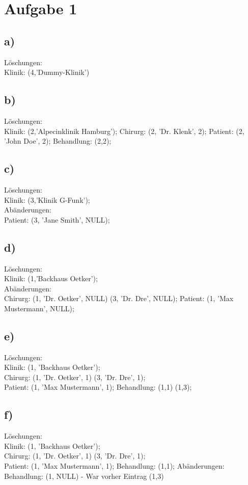 \section*{Aufgabe 1}
\subsection*{a)}
Löschungen:\\
Klinik: (4,'Dummy-Klinik')
\subsection*{b)}
Löschungen:\\
Klinik: (2,'Alpecinklinik Hamburg');
Chirurg: (2, 'Dr. Klenk', 2);
Patient: (2, 'John Doe', 2);
Behandlung: (2,2);
\subsection*{c)}
Löschungen:\\
Klinik: (3,'Klinik G-Funk');\\
Abänderungen:\\
Patient: (3, 'Jane Smith', NULL);
\subsection*{d)}
Löschungen:\\
Klinik: (1,'Backhaus Oetker');\\
Abänderungen:\\
Chirurg: (1, 'Dr. Oetker', NULL) (3, 'Dr. Dre', NULL);
Patient: (1, 'Max Mustermann', NULL);
\subsection*{e)}
Löschungen:\\
Klinik: (1, 'Backhaus Oetker');\\
Chirurg: (1, 'Dr. Oetker', 1) (3, 'Dr. Dre', 1);\\
Patient: (1, 'Max Mustermann', 1);
Behandlung: (1,1) (1,3);
\subsection*{f)}
Löschungen:\\
Klinik: (1, 'Backhaus Oetker');\\
Chirurg: (1, 'Dr. Oetker', 1) (3, 'Dr. Dre', 1);\\
Patient: (1, 'Max Mustermann', 1);
Behandlung: (1,1);
Abänderungen:\\
Behandlung: (1, NULL) - War vorher Eintrag (1,3)
